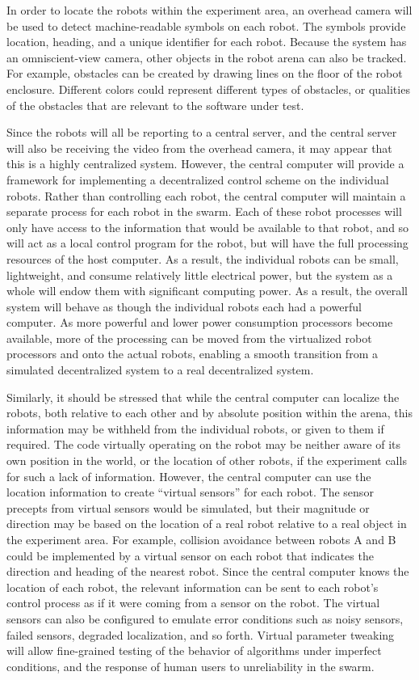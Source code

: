\documentclass[]{article}
\begin{document}
In order to locate the robots within the experiment area, an overhead camera will be used to detect machine-readable symbols on each robot. 
The symbols provide location, heading, and a unique identifier for each robot. 
Because the system has an omniscient-view camera, other objects in the robot arena can also be tracked. 
For example, obstacles can be created by drawing lines on the floor of the robot enclosure. 
Different colors could represent different types of obstacles, or qualities of the obstacles that are relevant to the software under test.

Since the robots will all be reporting to a central server, and the central server will also be receiving the video from the overhead camera, it may appear that this is a highly centralized system. 
However, the central computer will provide a framework for implementing a decentralized control scheme on the individual robots. 
Rather than controlling each robot, the central computer will maintain a separate process for each robot in the swarm. 
Each of these robot processes will only have access to the information that would be available to that robot, and so will act as a local control program for the robot, but will have the full processing resources of the host computer. 
As a result, the individual robots can be small, lightweight, and consume relatively little electrical power, but the system as a whole will endow them with significant computing power. 
As a result, the overall system will behave as though the individual robots each had a powerful computer. 
As more powerful and lower power consumption processors become available, more of the processing can be moved from the virtualized robot processors and onto the actual robots, enabling a smooth transition from a simulated decentralized system to a real decentralized system. 

Similarly, it should be stressed that while the central computer can localize the robots, both relative to each other and by absolute position within the arena, this information may be withheld from the individual robots, or given to them if required. 
The code virtually operating on the robot may be neither aware of its own position in the world, or the location of other robots, if the experiment calls for such a lack of information. 
However, the central computer can use the location information to create ``virtual sensors'' for each robot. 
The sensor precepts from virtual sensors would be simulated, but their magnitude or direction may be based on the location of a real robot relative to a real object in the experiment area. 
For example, collision avoidance between robots A and B could be implemented by a virtual sensor on each robot that indicates the direction and heading of the nearest robot. 
Since the central computer knows the location of each robot, the relevant information can be sent to each robot's control process as if it were coming from a sensor on the robot. 
The virtual sensors can also be configured to emulate error conditions such as noisy sensors, failed sensors, degraded localization, and so forth.
Virtual parameter tweaking will allow fine-grained testing of the behavior of algorithms under imperfect conditions, and the response of human users to unreliability in the swarm. 
\end{document}
